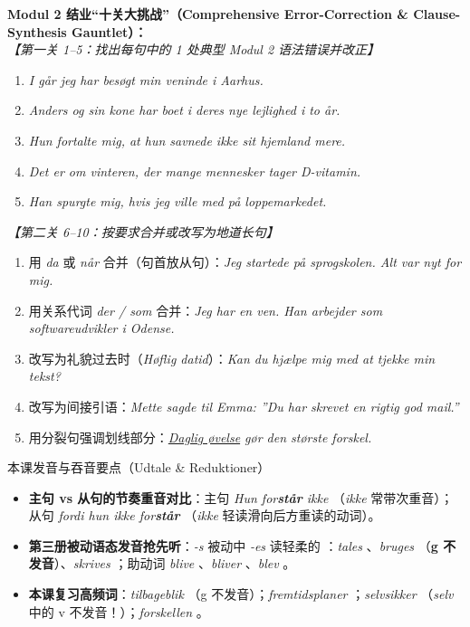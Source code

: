 \textbf{Modul 2 结业“十关大挑战”（Comprehensive Error-Correction \& Clause-Synthesis Gauntlet）：}\\
\textit{【第一关 1--5：找出每句中的 1 处典型 Modul 2 语法错误并改正】}
\begin{enumerate}
  \item[(1)] \textit{I går jeg har besøgt min veninde i Aarhus.}
  \item[(2)] \textit{Anders og sin kone har boet i deres nye lejlighed i to år.}
  \item[(3)] \textit{Hun fortalte mig, at hun savnede ikke sit hjemland mere.}
  \item[(4)] \textit{Det er om vinteren, der mange mennesker tager D-vitamin.}
  \item[(5)] \textit{Han spurgte mig, hvis jeg ville med på loppemarkedet.}
\end{enumerate}

\textit{【第二关 6--10：按要求合并或改写为地道长句】}
\begin{enumerate}
  \item[(6)] 用 \textit{da} 或 \textit{når} 合并（句首放从句）：\textit{Jeg startede på sprogskolen. Alt var nyt for mig.}
  \item[(7)] 用关系代词 \textit{der / som} 合并：\textit{Jeg har en ven. Han arbejder som softwareudvikler i Odense.}
  \item[(8)] 改写为礼貌过去时（\textit{Høflig datid}）：\textit{Kan du hjælpe mig med at tjekke min tekst?}
  \item[(9)] 改写为间接引语：\textit{Mette sagde til Emma: ”Du har skrevet en rigtig god mail.”}
  \item[(10)] 用分裂句强调划线部分：\textit{\underline{Daglig øvelse} gør den største forskel.}
\end{enumerate}

\begin{tipbox}{本课发音与吞音要点（Udtale \& Reduktioner）}
\begin{itemize}
  \item \textbf{主句 vs 从句的节奏重音对比}：主句 \textit{Hun for\textbf{står} ikke} （\textit{ikke} 常带次重音）；从句 \textit{fordi hun ikke for\textbf{står}} （\textit{ikke} 轻读滑向后方重读的动词）。
  \item \textbf{第三册被动语态发音抢先听}：\textit{-s} 被动中 \textit{-es} 读轻柔的 ：\textit{tales} 、\textit{bruges} （\textbf{g 不发音}）、\textit{skrives} ；助动词 \textit{blive} 、\textit{bliver} 、\textit{blev} 。
  \item \textbf{本课复习高频词}：\textit{tilbageblik} （g 不发音）；\textit{fremtidsplaner} ；\textit{selvsikker} （\textit{selv} 中的 v 不发音！）；\textit{forskellen} 。
\end{itemize}
\end{tipbox}

